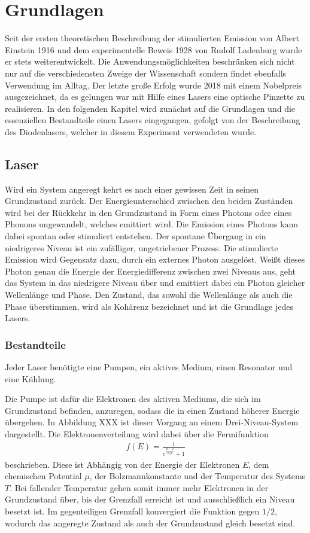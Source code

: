 \section{Grundlagen}
\label{sec:Grundlagen}
Seit der ersten theoretischen Beschreibung der stimulierten Emission von Albert Einstein 1916 und dem experimentelle Beweis 1928 von Rudolf Ladenburg wurde er stets weiterentwickelt. Die Anwendungsmöglichkeiten beschränken sich nicht nur auf die verschiedensten Zweige der Wissenschaft sondern findet ebenfalls Verwendung im Alltag. Der letzte große Erfolg wurde 2018 mit einem Nobelpreis ausgezeichnet, da es gelungen war mit Hilfe eines Lasers eine optische Pinzette zu realisieren.
In den folgenden Kapitel wird zunächst auf die Grundlagen und die essenziellen Bestandteile einen Lasers eingegangen, gefolgt von der Beschreibung des Diodenlasers, welcher in diesem Experiment verwendeten wurde.

\subsection{Laser}
Wird ein System angeregt kehrt es nach einer gewissen Zeit in seinen Grundzustand zurück. Der Energieunterschied zwischen den beiden Zuständen wird bei der Rückkehr in den Grundzustand in Form eines Photons oder eines Phonons ungewandelt, welches emittiert wird. Die Emission eines Photons kann dabei spontan oder stimuliert entstehen. Der spontane Übergang in ein niedrigeres Niveau ist ein zufälliger, ungetriebener Prozess. Die stimulierte Emission wird Gegensatz dazu, durch ein externes Photon ausgelöst. Weißt dieses Photon genau die Energie der Energiedifferenz zwischen zwei Niveaus aus, geht das System in das niedrigere Niveau über und emittiert dabei ein Photon gleicher Wellenlänge und Phase. Den Zustand, das sowohl die Wellenlänge als auch die Phase überstimmen, wird als Kohärenz bezeichnet und ist die Grundlage jedes Lasers.

\subsubsection{Bestandteile}
Jeder Laser benötigte eine Pumpen, ein aktives Medium, einen Resonator und eine Kühlung.

Die Pumpe ist dafür die Elektronen des aktiven Mediums, die sich im Grundzustand befinden, anzuregen, sodass die in einen Zustand höherer Energie übergehen. In Abbildung XXX ist dieser Vorgang an einem Drei-Niveau-System dargestellt. Die Elektronenverteilung wird dabei über die Fermifunktion
\begin{align}
	f(E)=\frac{1}{e^{\frac{E-\mu}{k_B T}}+1}
\end{align}
beschrieben. Diese ist Abhängig von der Energie der Elektronen $E$, dem chemischen Potential $\mu$, der Bolzmannkonstante und der Temperatur des Systems $T$. Bei fallender Temperatur gehen somit immer mehr Elektronen in der Grundzustand über, bis der Grenzfall erreicht ist und ausschließlich ein Niveau besetzt ist. Im gegenteiligen Grenzfall konvergiert die Funktion gegen $1/2$, wodurch das angeregte Zustand als auch der Grundzustand gleich besetzt sind. 

